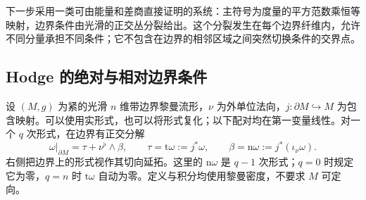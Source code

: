 下一步采用一类可由能量和差商直接证明的系统：主符号为度量的平方范数乘恒等映射，边界条件由光滑的正交丛分裂给出。这个分裂发生在每个边界纤维内，允许不同分量承担不同条件；它不包含在边界的相邻区域之间突然切换条件的交界点。

\subsection{Hodge 的绝对与相对边界条件}
\label{g3:subsec:1403:03}
设 \((M,g)\) 为紧的光滑 \(n\) 维带边界黎曼流形，\(\nu\) 为外单位法向，\(j:\partial M\hookrightarrow M\) 为包含映射。可以使用实形式，也可以将形式复化；以下配对均在第一变量线性。对一个 \(q\) 次形式，在边界有正交分解
\begin{equation}\label{g3:eq:form-tangential-normal-traces}
	\omega|_{\partial M}=\tau+\nu^\flat\wedge\beta,
	\qquad \tau=\mathrm t\omega:=j^*\omega,
	\qquad \beta=\mathrm n\omega:=j^*(\iota_\nu\omega).
\end{equation}
右侧把边界上的形式视作其切向延拓。这里的 \(\mathrm n\omega\) 是 \(q-1\) 次形式；\(q=0\) 时规定它为零，\(q=n\) 时 \(\mathrm t\omega\) 自动为零。定义与积分均使用黎曼密度，不要求 \(M\) 可定向。

